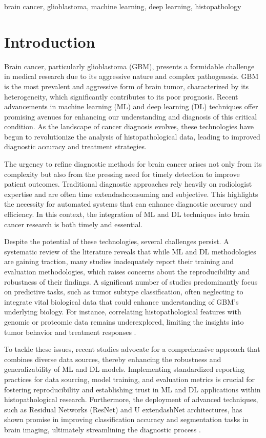 \documentclass[runningheads]{llncs}
\begin{document}
\begin{keywords}
brain cancer, glioblastoma, machine learning, deep learning, histopathology
\end{keywords}

\section{Introduction}
Brain cancer, particularly glioblastoma (GBM), presents a formidable challenge in medical research due to its aggressive nature and complex pathogenesis. GBM is the most prevalent and aggressive form of brain tumor, characterized by its heterogeneity, which significantly contributes to its poor prognosis. Recent advancements in machine learning (ML) and deep learning (DL) techniques offer promising avenues for enhancing our understanding and diagnosis of this critical condition. As the landscape of cancer diagnosis evolves, these technologies have begun to revolutionize the analysis of histopathological data, leading to improved diagnostic accuracy and treatment strategies.

The urgency to refine diagnostic methods for brain cancer arises not only from its complexity but also from the pressing need for timely detection to improve patient outcomes. Traditional diagnostic approaches rely heavily on radiologist expertise and are often time	extendash{}consuming and subjective. This highlights the necessity for automated systems that can enhance diagnostic accuracy and efficiency. In this context, the integration of ML and DL techniques into brain cancer research is both timely and essential.

Despite the potential of these technologies, several challenges persist. A systematic review of the literature reveals that while ML and DL methodologies are gaining traction, many studies inadequately report their training and evaluation methodologies, which raises concerns about the reproducibility and robustness of their findings. A significant number of studies predominantly focus on predictive tasks, such as tumor subtype classification, often neglecting to integrate vital biological data that could enhance understanding of GBM's underlying biology. For instance, correlating histopathological features with genomic or proteomic data remains underexplored, limiting the insights into tumor behavior and treatment responses \cite{Chun_2025}.

To tackle these issues, recent studies advocate for a comprehensive approach that combines diverse data sources, thereby enhancing the robustness and generalizability of ML and DL models. Implementing standardized reporting practices for data sourcing, model training, and evaluation metrics is crucial for fostering reproducibility and establishing trust in ML and DL applications within histopathological research. Furthermore, the deployment of advanced techniques, such as Residual Networks (ResNet) and U	extendash{}Net architectures, has shown promise in improving classification accuracy and segmentation tasks in brain imaging, ultimately streamlining the diagnostic process \cite{Sarah_2020, Akter_2024}.
\end{document}
